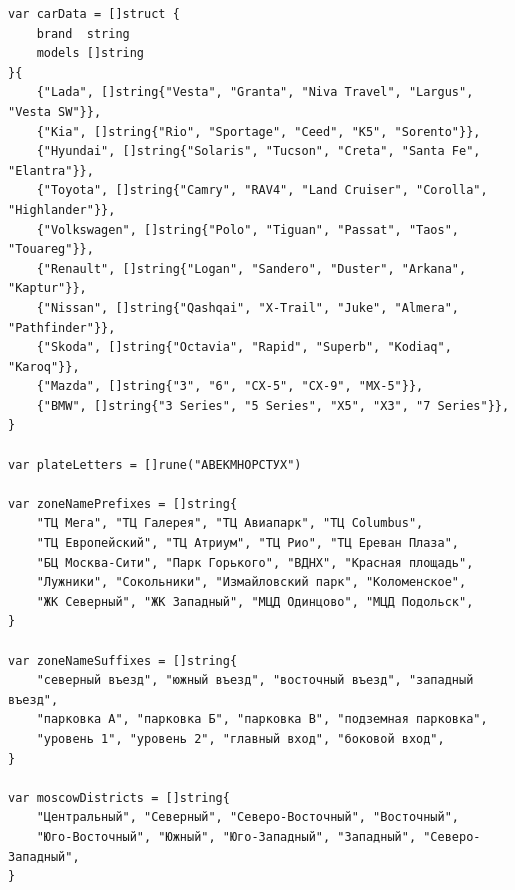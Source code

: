 \begin{lstlisting}[style=gostyle, caption={Статические данные для генерации (internal/seeder/data.go)}, label={lst:goData}]
var carData = []struct {
	brand  string
	models []string
}{
	{"Lada", []string{"Vesta", "Granta", "Niva Travel", "Largus", "Vesta SW"}},
	{"Kia", []string{"Rio", "Sportage", "Ceed", "K5", "Sorento"}},
	{"Hyundai", []string{"Solaris", "Tucson", "Creta", "Santa Fe", "Elantra"}},
	{"Toyota", []string{"Camry", "RAV4", "Land Cruiser", "Corolla", "Highlander"}},
	{"Volkswagen", []string{"Polo", "Tiguan", "Passat", "Taos", "Touareg"}},
	{"Renault", []string{"Logan", "Sandero", "Duster", "Arkana", "Kaptur"}},
	{"Nissan", []string{"Qashqai", "X-Trail", "Juke", "Almera", "Pathfinder"}},
	{"Skoda", []string{"Octavia", "Rapid", "Superb", "Kodiaq", "Karoq"}},
	{"Mazda", []string{"3", "6", "CX-5", "CX-9", "MX-5"}},
	{"BMW", []string{"3 Series", "5 Series", "X5", "X3", "7 Series"}},
}

var plateLetters = []rune("АВЕКМНОРСТУХ")

var zoneNamePrefixes = []string{
	"ТЦ Мега", "ТЦ Галерея", "ТЦ Авиапарк", "ТЦ Columbus",
	"ТЦ Европейский", "ТЦ Атриум", "ТЦ Рио", "ТЦ Ереван Плаза",
	"БЦ Москва-Сити", "Парк Горького", "ВДНХ", "Красная площадь",
	"Лужники", "Сокольники", "Измайловский парк", "Коломенское",
	"ЖК Северный", "ЖК Западный", "МЦД Одинцово", "МЦД Подольск",
}

var zoneNameSuffixes = []string{
	"северный въезд", "южный въезд", "восточный въезд", "западный въезд",
	"парковка А", "парковка Б", "парковка В", "подземная парковка",
	"уровень 1", "уровень 2", "главный вход", "боковой вход",
}

var moscowDistricts = []string{
	"Центральный", "Северный", "Северо-Восточный", "Восточный",
	"Юго-Восточный", "Южный", "Юго-Западный", "Западный", "Северо-Западный",
}
\end{lstlisting}
\newpage

